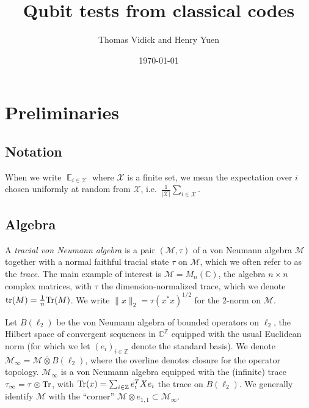 \documentclass[11pt]{article}
\theoremstyle{definition}
\newcommand{\Tr}{\mbox{\rm Tr}}
\DeclareMathOperator*{\Expectation}{\mathbb{E}}
\newcommand{\Es}[1]{\Expectation_{#1}}
\newcommand{\C}{\ensuremath{\mathbb{C}}}
\newcommand{\Z}{\ensuremath{\mathbb{Z}}}
\newcommand{\mM}{\ensuremath{\mathcal{M}}}
\newcommand{\mX}{\ensuremath{\mathcal{X}}}
\DeclareMathOperator{\tr}{tr}
\begin{document}
\title{Qubit tests from classical codes}

\author{Thomas Vidick and Henry Yuen}
\date{\today}
\maketitle

\noteswarning


\begin{abstract}

\end{abstract}

	\section{Preliminaries}

\subsection{Notation}

When we write $\Es{i\in \mX}$ where $\mX$ is a finite set, we mean the expectation over $i$ chosen uniformly at random from $\mX$, i.e.\ $\frac{1}{|\mX|} \sum_{i\in \mX}$. 

\subsection{Algebra}

  A \emph{tracial von Neumann algebra} is a pair $(\mM,\tau)$ of a von Neumann algebra $\mM$ together with a normal faithful tracial state $\tau$ on $\mM$, which we often refer to as the \emph{trace}. The main example of interest is $\mM=M_n(\C)$, the algebra $n\times n$ complex matrices, with $\tau$ the dimension-normalized trace, which we denote $\tr(M)=\frac{1}{n}\Tr(M)$. 	We write $\|x\|_2=\tau(x^*x)^{1/2}$ for the $2$-norm on $\mM$.
	
	Let $B(\ell_2)$ be the von Neumann algebra of bounded operators on $\ell_2$, the Hilbert space of convergent sequences in $\C^\Z$ equipped with the usual Euclidean norm (for which we let $(e_i)_{i \in \Z}$ denote the standard basis). We denote $\mM_\infty = \mM \overline{\otimes} B(\ell_2)$, where the overline denotes closure for the operator topology. $\mM_\infty$ is a von Neumann algebra equipped with the (infinite) trace $\tau_\infty = \tau \otimes \Tr$, with $\Tr(x)=\sum_{i\in \Z} e_i^T X e_i$ the trace on $B(\ell_2)$. We generally identify $\mM$ with the ``corner'' $\mM\otimes e_{1,1}\subset \mM_\infty$. 
\end{document}
